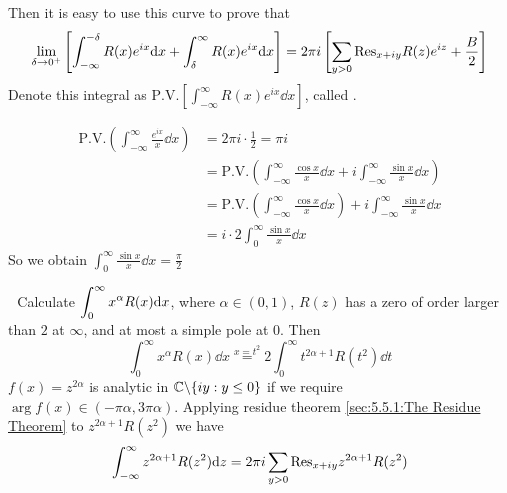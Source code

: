 Then it is easy to use this curve to prove that 
\begin{equation*}
    \lim_{\delta\to 0^+}\left[\int_{-\infty}^{-\delta}R(x)e^{ix}\mathrm{d} x+\int_{\delta}^\infty R(x)e^{ix}\mathrm{d} x\right]=2\pi i \left[\sum_{y>0}\mathrm{Res}_{x+iy}R(z)e^{iz}+\frac{B}{2}\right]
\end{equation*}
Denote this integral as  $ \mathrm{P.V.}\left[\int_{-\infty}^\infty R(x)e^{ix}\dd x\right] $, called .

\begin{example}
    \begin{align*}
        \mathrm{P.V.}\left(\int_{-\infty}^\infty \frac{e^{ix}}{x}\dd x\right)&=2\pi i \cdot\frac{1 }{2}=\pi i\\
        &=\mathrm{P.V.}\left(\int_{-\infty}^\infty \frac{\cos x}{x}\dd x+i\int_{-\infty}^\infty\frac{\sin x}{x}\dd x\right)\\
        &=\mathrm{P.V.}\left(\int_{-\infty}^\infty \frac{\cos x}{x}\dd x\right)+i\int_{-\infty}^\infty \frac{\sin x}{x}\dd x\\
        &=i\cdot 2\int_{0}^\infty\frac{\sin x}{x}\dd x
    \end{align*}
    So we obtain  $ \int_0^\infty\frac{\sin x}{x}\dd x=\frac{\pi }{2} $ 
\end{example}
\noindent{}\,\,\,\,Calculate  $ \displaystyle\int_0^\infty x^\alpha R(x)\mathrm{d} x $, where  $ \alpha\in(0,1) $, $ R(z) $ has a zero of order larger than  $ 2 $ at  $ \infty $, and at most a simple pole at  $ 0 $.
Then 
\begin{equation}
    \int_0^\infty x^\alpha R(x)\dd x\overset{x=t^2}{=}2\int_0^\infty t^{2\alpha+1}R(t^2)\dd t
\end{equation}
 $ f(x)=z^{2\alpha } $ is analytic in  $ \mathbb C\backslash\{iy:y \leq 0\} $ if we require  $ \arg f(x)\in(-\pi \alpha,3\pi\alpha) $. Applying residue theorem \ref{sec:5.5.1:The Residue Theorem} to  $ z^{2\alpha+1}R(z^2) $ we have 
\begin{equation*}
    \int_{-\infty}^\infty z^{2\alpha+1}R(z^2)\mathrm{d} z=2\pi i\sum_{y>0}\mathrm{Res}_{x+iy}z^{2\alpha+1}R(z^2)
\end{equation*}
